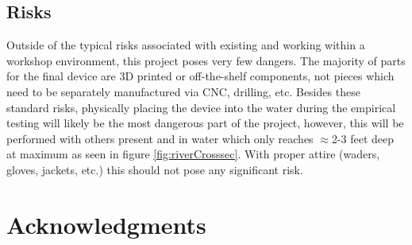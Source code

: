 \documentclass[fleqn,10pt]{SelfArx} %
\begin{document}
	\subsection{Risks}
	Outside of the typical risks associated with existing and working within a workshop environment, this project poses very few dangers. The majority of parts for the final device are 3D printed or off-the-shelf components, not pieces which need to be separately manufactured via CNC, drilling, etc. Besides these standard risks, physically placing the device into the water during the empirical testing will likely be the most dangerous part of the project, however, this will be performed with others present and in water which only reaches $\approx$2-3 feet deep at maximum as seen in figure \ref{fig:riverCrosssec}. With proper attire (waders, gloves, jackets, etc.) this should not pose any significant risk.
	
	
	\section*{Acknowledgments} %
	
	
	
	
	
	\nocite{*}
	
	
	
\end{document}
